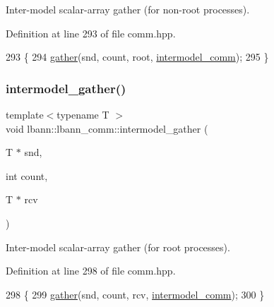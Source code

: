 Inter-\/model scalar-\/array gather (for non-\/root processes). 

Definition at line 293 of file comm.\+hpp.


\begin{DoxyCode}
293                                                       \{
294     \hyperlink{classlbann_1_1lbann__comm_aa784298e6ed0f9f01a20b179d5110df9}{gather}(snd, count, root, \hyperlink{classlbann_1_1lbann__comm_a2c51c5d8faf4f0ab4f43b892c55e597b}{intermodel\_comm});
295   \}
\end{DoxyCode}
\mbox{\label{classlbann_1_1lbann__comm_a954d59f6574884b9a6c7d5228e9460d4}} 
\subsubsection{\texorpdfstring{intermodel\+\_\+gather()}{intermodel\_gather()}\hspace{0.1cm}{\footnotesize\ttfamily [4/4]}}
{\footnotesize\ttfamily template$<$typename T $>$ \\
void lbann\+::lbann\+\_\+comm\+::intermodel\+\_\+gather (\begin{DoxyParamCaption}\item[{T $\ast$}]{snd,  }\item[{int}]{count,  }\item[{T $\ast$}]{rcv }\end{DoxyParamCaption})\hspace{0.3cm}{\ttfamily [inline]}}

Inter-\/model scalar-\/array gather (for root processes). 

Definition at line 298 of file comm.\+hpp.


\begin{DoxyCode}
298                                                     \{
299     \hyperlink{classlbann_1_1lbann__comm_aa784298e6ed0f9f01a20b179d5110df9}{gather}(snd, count, rcv, \hyperlink{classlbann_1_1lbann__comm_a2c51c5d8faf4f0ab4f43b892c55e597b}{intermodel\_comm});
300   \}
\end{DoxyCode}
\mbox{\label{classlbann_1_1lbann__comm_a485715aa8e0e05d9ced78346342692a5}} 
